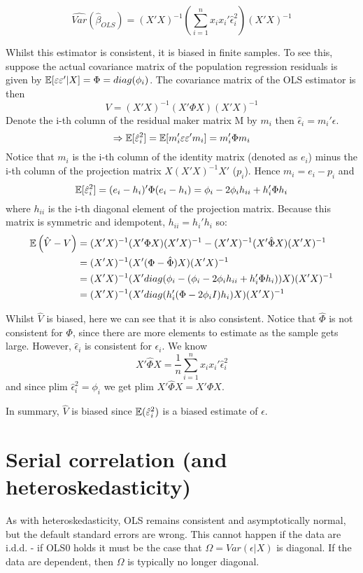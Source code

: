 \documentclass[DIV=14,titlepage=false]{scrreprt}
\begin{document}
\begin{definition}
    \[\widehat{Var}(\hat\beta_{OLS}) = (X'X)^{-1}\left(\sum_{i=1}^{n}x_ix_i'\hat \epsilon_i ^2 \right)(X'X)^{-1} \]
\end{definition}
\begin{note}
Whilst this estimator is consistent, it is biased in finite samples. To see this, suppose the actual covariance matrix of the population regression residuals is given by $\mathbb{E}[\varepsilon \varepsilon'|X] = \Phi = diag(\phi_i)$. The covariance matrix of the OLS estimator is then \[V=(X'X)^{-1}(X'\Phi X) (X'X)^{-1}\] Denote the i-th column of the residual maker matrix M by $m_i$ then $\hat \epsilon_i = m_i ' \epsilon$. 
\[ \Rightarrow \mathbb{E}[\hat {\varepsilon}_i^2] = \mathbb{E}[m_i' \varepsilon \varepsilon' m_i] = m_i'\Phi m_i \]
Notice that $m_i$ is the i-th column of the identity matrix (denoted as $e_i$) minus the i-th column of the projection matrix $X(X'X)^{-1}X'$ ($p_i$). Hence $m_i=e_i - p_i$ and 
\[ \mathbb{E}[\hat {\varepsilon}_i^2] = (e_i-h_i)'\Phi (e_i-h_i) = \phi_i - 2\phi_i h_{ii}+h_i'\Phi h_i \]
where $h_{ii}$ is the i-th diagonal element of the projection matrix. Because this matrix is symmetric and idempotent, $h_{ii} = h_i'h_i$ so: 
\begin{align*}
    \mathbb{E}\left(\hat V - V\right) &= (X'X)^{-1}(X'\Phi X) (X'X)^{-1} - (X'X)^{-1}(X' \hat \Phi X) (X'X)^{-1}\\
    &= (X'X)^{-1}(X'(\Phi-\hat \Phi) X) (X'X)^{-1}\\
    &= (X'X)^{-1}(X' diag(\phi_i - (\phi_i - 2\phi_i h_{ii}+h_i'\Phi h_i) ) X) (X'X)^{-1}\\
    &= (X'X)^{-1}(X'diag(h_i'(\Phi - 2\phi_iI)h_i)X) (X'X)^{-1}
\end{align*}


Whilst $\hat V$ is biased, here we can see that it is also consistent. Notice that $ \hat \Phi $ is not consistent for $\Phi$, since there are more elements to estimate as the sample gets large. However, $\hat \epsilon_i$ is consistent for $\epsilon_i$. We know \[X'\hat \Phi X = \frac{1}{n}\sum_{i=1}^{n}  x_ix_i'\hat \epsilon_i^2 \] and since plim $\hat \epsilon_i ^2 = \phi_i$ we get plim $X'\hat \Phi X = X' \Phi X$.

In summary, $\hat V$ is biased since $\mathbb{E}(\hat{\varepsilon}^2_i)$ is a biased estimate of $\epsilon$.
\end{note}

\section{Serial correlation (and heteroskedasticity)}
As with heteroskedasticity, OLS remains consistent and asymptotically normal, but the default standard errors are wrong. This cannot happen if the data are i.d.d. - if OLS0 holds it must be the case that $\Omega = Var(\epsilon|X)$ is diagonal. If the data are dependent, then $\Omega$ is typically no longer diagonal.
\end{document}
